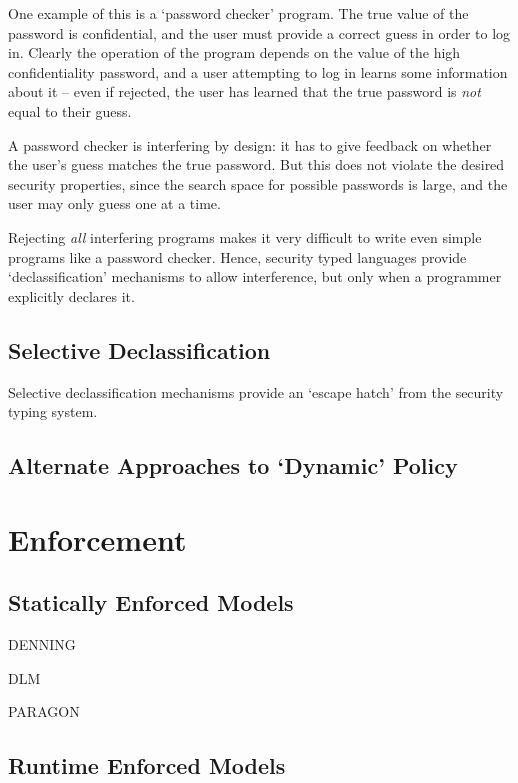 One example of this is a `password checker' program. The true value of the password is confidential, and the user must provide a correct guess in order to log in. Clearly the operation of the program depends on the value of the high confidentiality password, and a user attempting to log in learns some information about it -- even if rejected, the user has learned that the true password is \textit{not} equal to their guess.

A password checker is interfering by design: it has to give feedback on whether the user's guess matches the true password. But this does not violate the desired security properties, since the search space for possible passwords is large, and the user may only guess one at a time.

Rejecting \textit{all} interfering programs makes it very difficult to write even simple programs like a password checker. Hence, security typed languages provide `declassification' mechanisms to allow interference, but only when a programmer explicitly declares it.

\subsection{Selective Declassification}

Selective declassification mechanisms provide an `escape hatch' from the security typing system. 

\subsection{Alternate Approaches to `Dynamic' Policy}

\section{Enforcement}

\subsection{Statically Enforced Models}

DENNING

DLM

PARAGON

\subsection{Runtime Enforced Models}




